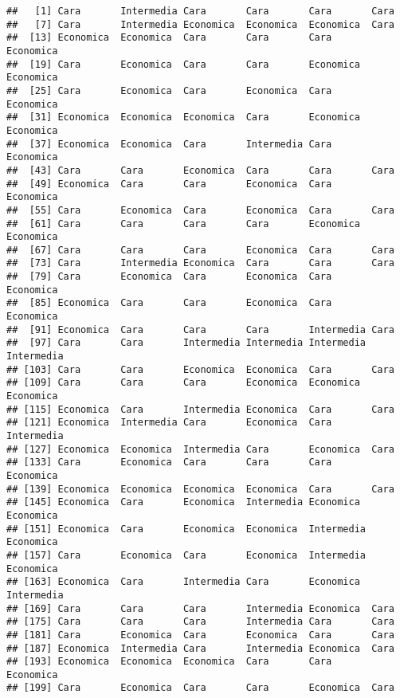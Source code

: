 \documentclass[
]{article}
\begin{document}
\begin{verbatim}
##   [1] Cara       Intermedia Cara       Cara       Cara       Cara      
##   [7] Cara       Intermedia Economica  Economica  Economica  Cara      
##  [13] Economica  Economica  Cara       Cara       Cara       Economica 
##  [19] Cara       Economica  Cara       Cara       Economica  Economica 
##  [25] Cara       Economica  Cara       Economica  Cara       Economica 
##  [31] Economica  Economica  Economica  Cara       Economica  Economica 
##  [37] Economica  Economica  Cara       Intermedia Cara       Economica 
##  [43] Cara       Cara       Economica  Cara       Cara       Cara      
##  [49] Economica  Cara       Cara       Economica  Cara       Economica 
##  [55] Cara       Economica  Cara       Economica  Cara       Cara      
##  [61] Cara       Cara       Cara       Cara       Economica  Economica 
##  [67] Cara       Cara       Cara       Economica  Cara       Cara      
##  [73] Cara       Intermedia Economica  Cara       Cara       Cara      
##  [79] Cara       Economica  Cara       Economica  Cara       Economica 
##  [85] Economica  Cara       Cara       Economica  Cara       Economica 
##  [91] Economica  Cara       Cara       Cara       Intermedia Cara      
##  [97] Cara       Cara       Intermedia Intermedia Intermedia Intermedia
## [103] Cara       Cara       Economica  Economica  Cara       Cara      
## [109] Cara       Cara       Cara       Economica  Economica  Economica 
## [115] Economica  Cara       Intermedia Economica  Cara       Cara      
## [121] Economica  Intermedia Cara       Economica  Cara       Intermedia
## [127] Economica  Economica  Intermedia Cara       Economica  Cara      
## [133] Cara       Economica  Cara       Cara       Cara       Economica 
## [139] Economica  Economica  Economica  Economica  Cara       Cara      
## [145] Economica  Cara       Economica  Intermedia Economica  Economica 
## [151] Economica  Cara       Economica  Economica  Intermedia Economica 
## [157] Cara       Economica  Cara       Economica  Intermedia Economica 
## [163] Economica  Cara       Intermedia Cara       Economica  Intermedia
## [169] Cara       Cara       Cara       Intermedia Economica  Cara      
## [175] Cara       Cara       Cara       Intermedia Cara       Cara      
## [181] Cara       Economica  Cara       Economica  Cara       Cara      
## [187] Economica  Intermedia Cara       Intermedia Economica  Cara      
## [193] Economica  Economica  Economica  Cara       Cara       Economica 
## [199] Cara       Economica  Cara       Cara       Economica  Cara      

\end{verbatim}
\end{document}
